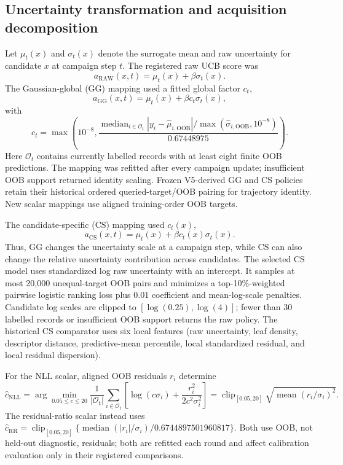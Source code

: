 \documentclass[10pt]{article}
\begin{document}
\subsection{Uncertainty transformation and acquisition decomposition}
Let $\mu_t(x)$ and $\sigma_t(x)$ denote the surrogate mean and raw uncertainty
for candidate $x$ at campaign step $t$. The registered raw UCB score was
\begin{equation}
a_{\mathrm{RAW}}(x,t)=\mu_t(x)+\beta\sigma_t(x).
\end{equation}
The Gaussian-global (GG) mapping used a fitted global factor $c_t$,
\begin{equation}
a_{\mathrm{GG}}(x,t)=\mu_t(x)+\beta c_t\sigma_t(x),
\end{equation}
with
\begin{equation}
c_t=\max\!\left(10^{-8},
\frac{\operatorname{median}_{i\in\mathcal O_t}
|y_i-\hat\mu_{i,\mathrm{OOB}}|/
\max(\hat\sigma_{i,\mathrm{OOB}},10^{-8})}
{0.67448975}\right).
\end{equation}
Here $\mathcal O_t$ contains currently labelled records with at least eight
finite OOB predictions. The mapping was refitted after every campaign update;
insufficient OOB support returned identity scaling. Frozen V5-derived GG and
CS policies retain their historical ordered queried-target/OOB pairing for
trajectory identity. New scalar mappings use aligned training-order OOB
targets.

The candidate-specific (CS) mapping used $c_t(x)$,
\begin{equation}
a_{\mathrm{CS}}(x,t)=\mu_t(x)+\beta c_t(x)\sigma_t(x).
\end{equation}
Thus, GG changes the uncertainty scale at a campaign step, while CS can also
change the relative uncertainty contribution across candidates. The selected
CS model uses standardized log raw uncertainty with an intercept. It samples
at most 20,000 unequal-target OOB pairs and minimizes a top-10\%-weighted
pairwise logistic ranking loss plus $0.01$ coefficient and mean-log-scale
penalties. Candidate log scales are clipped to
$[\log(0.25),\log(4)]$; fewer than 30 labelled records or insufficient OOB
support returns the raw policy. The historical CS comparator uses six local
features (raw uncertainty, leaf density, descriptor distance, predictive-mean
percentile, local standardized residual, and local residual dispersion).

For the NLL scalar, aligned OOB residuals $r_i$ determine
\begin{equation}
\hat c_{\mathrm{NLL}}=\arg\min_{0.05\le c\le20}
\frac{1}{|\mathcal O_t|}\sum_{i\in\mathcal O_t}
\left[\log(c\sigma_i)+\frac{r_i^2}{2c^2\sigma_i^2}\right]
=\operatorname{clip}_{[0.05,20]}
\sqrt{\operatorname{mean}(r_i/\sigma_i)^2}.
\end{equation}
The residual-ratio scalar instead uses
$\hat c_{\mathrm{RR}}=\operatorname{clip}_{[0.05,20]}
\{\operatorname{median}(|r_i|/\sigma_i)/0.6744897501960817\}$.
Both use OOB, not held-out diagnostic, residuals; both are refitted each round
and affect calibration evaluation only in their registered comparisons.
\end{document}
